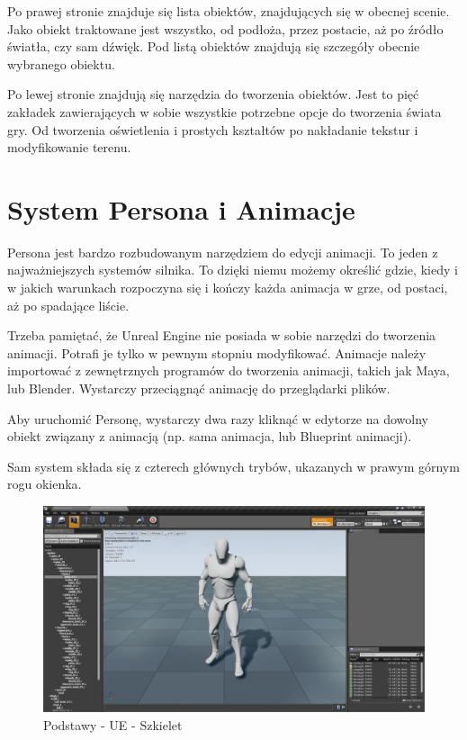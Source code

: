 \documentclass[12pt]{xmgr}
\begin{document}
Po prawej stronie znajduje się lista obiektów, znajdujących się w obecnej scenie. Jako obiekt traktowane jest wszystko, od podłoża, przez postacie, aż po źródło światła, czy sam dźwięk.
Pod listą obiektów znajdują się szczegóły obecnie wybranego obiektu.

Po lewej stronie znajdują się narzędzia do tworzenia obiektów. Jest to pięć zakładek zawierających w sobie wszystkie potrzebne opcje do tworzenia świata gry. Od tworzenia oświetlenia i prostych kształtów po nakładanie tekstur i modyfikowanie terenu.

\section{System Persona i Animacje}
Persona jest bardzo rozbudowanym narzędziem do edycji animacji. To jeden z najważniejszych systemów silnika. To dzięki niemu możemy określić gdzie, kiedy i w jakich warunkach  rozpoczyna się i kończy każda animacja w grze, od postaci, aż po spadające liście.

Trzeba pamiętać, że Unreal Engine nie posiada w sobie narzędzi do tworzenia animacji. Potrafi je tylko w pewnym stopniu modyfikować. Animacje należy importować z zewnętrznych programów do tworzenia animacji, takich jak Maya, lub Blender. Wystarczy przeciągnąć animację do przeglądarki plików.

Aby uruchomić Personę, wystarczy dwa razy kliknąć w edytorze na dowolny obiekt związany z animacją (np. sama animacja, lub Blueprint animacji).

Sam system składa się z czterech głównych trybów, ukazanych w prawym górnym rogu okienka.

\begin{figure}[!htb]
    \begin{center}
    \includegraphics[scale=0.25]{Screeny/Skeleton}
    \end{center}
    \caption{Podstawy - UE - Szkielet}
\end{figure}
\end{document}

